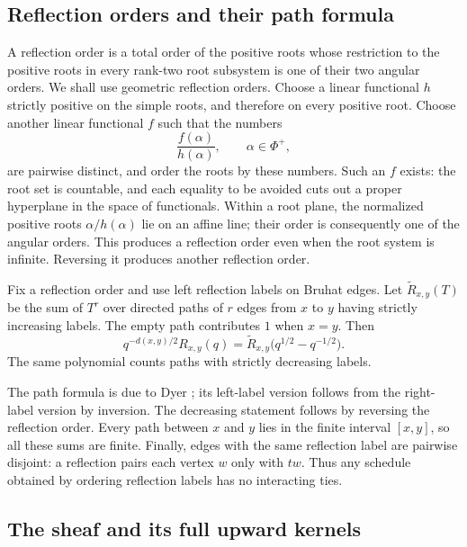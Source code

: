 \subsection{Reflection orders and their path formula}

A reflection order is a total order of the positive roots whose
restriction to the positive roots in every rank-two root subsystem is one
of their two angular orders.  We shall use geometric reflection orders.
Choose a linear functional $h$ strictly positive on the simple roots, and
therefore on every positive root.  Choose another linear functional $f$
such that the numbers
\[
 \frac{f(\alpha)}{h(\alpha)},\qquad \alpha\in\Phi^+,
\]
are pairwise distinct, and order the roots by these numbers.  Such an $f$
exists: the root set is countable, and each equality to be avoided cuts
out a proper hyperplane in the space of functionals.  Within a root plane,
the normalized positive roots $\alpha/h(\alpha)$ lie on an affine line;
their order is consequently one of the angular orders.  This produces a
reflection order even when the root system is infinite.  Reversing it
produces another reflection order.

\begin{theorem}
\label{bg:paths}
Fix a reflection order and use left reflection labels on Bruhat edges.
Let $\widetilde R_{x,y}(T)$ be the sum of $T^r$ over directed paths of $r$
edges from $x$ to $y$ having strictly increasing labels.  The empty path
contributes $1$ when $x=y$.  Then
\begin{equation}
\label{eq:bg-path-formula}
 q^{-d(x,y)/2}R_{x,y}(q)
 =\widetilde R_{x,y}\bigl(q^{1/2}-q^{-1/2}\bigr).
\end{equation}
The same polynomial counts paths with strictly decreasing labels.
\end{theorem}

The path formula is due to Dyer \cite[Corollary~3.4]{Dyer93}; its left-label version
follows from the right-label version by inversion.  The decreasing
statement follows by reversing the reflection order.  Every path between
$x$ and $y$ lies in the finite interval $[x,y]$, so all these sums are
finite.  Finally, edges with the same reflection label are pairwise
disjoint: a reflection pairs each vertex $w$ only with $tw$.  Thus any
schedule obtained by ordering reflection labels has no interacting ties.

\subsection{The sheaf and its full upward kernels}

